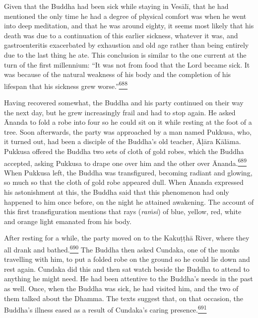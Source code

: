 Given that the Buddha had been sick while staying in Vesālī, that he had
mentioned the only time he had a degree of physical comfort was when he
went into deep meditation, and that he was around eighty, it seems most
likely that his death was due to a continuation of this earlier
sickness, whatever it was, and gastroenteritis exacerbated by exhaustion
and old age rather than being entirely due to the last thing he ate.
This conclusion is similar to the one current at the turn of the first
millennium: ``It was not from food that the Lord became sick. It was
because of the natural weakness of his body and the completion of his
lifespan that his sickness grew
worse.''\label{footprints_split_017.html_fnref688}\hyperref[footprints_split_025.htmlux5cux23fn688]{\textsuperscript{688}}

Having recovered somewhat, the Buddha and his party continued on their
way the next day, but he grew increasingly frail and had to stop again.
He asked Ānanda to fold a robe into four so he could sit on it while
resting at the foot of a tree. Soon afterwards, the party was approached
by a man named Pukkusa, who, it turned out, had been a disciple of the
Buddha's old teacher, Āḷāra Kālāma. Pukkusa offered the Buddha two sets
of cloth of gold robes, which the Buddha accepted, asking Pukkusa to
drape one over him and the other over
Ānanda.\label{footprints_split_017.html_fnref689}\hyperref[footprints_split_025.htmlux5cux23fn689]{\textsuperscript{689}}
When Pukkusa left, the Buddha was transfigured, becoming radiant and
glowing, so much so that the cloth of gold robe appeared dull. When
Ānanda expressed his astonishment at this, the Buddha said that this
phenomenon had only happened to him once before, on the night he
attained awakening. The account of this first transfiguration mentions
that rays (\emph{raṁsi}) of blue, yellow, red, white and orange light
emanated from his body.

After resting for a while, the party moved on to the Kakuṭṭhā River,
where they all drank and
bathed.\label{footprints_split_017.html_fnref690}\hyperref[footprints_split_025.htmlux5cux23fn690]{\textsuperscript{690}}
The Buddha then asked Cundaka, one of the monks travelling with him, to
put a folded robe on the ground so he could lie down and rest again.
Cundaka did this and then sat watch beside the Buddha to attend to
anything he might need. He had been attentive to the Buddha's needs in
the past as well. Once, when the Buddha was sick, he had visited him,
and the two of them talked about the Dhamma. The texts suggest that, on
that occasion, the Buddha's illness eased as a result of Cundaka's
caring
presence.\label{footprints_split_017.html_fnref691}\hyperref[footprints_split_025.htmlux5cux23fn691]{\textsuperscript{691}}

